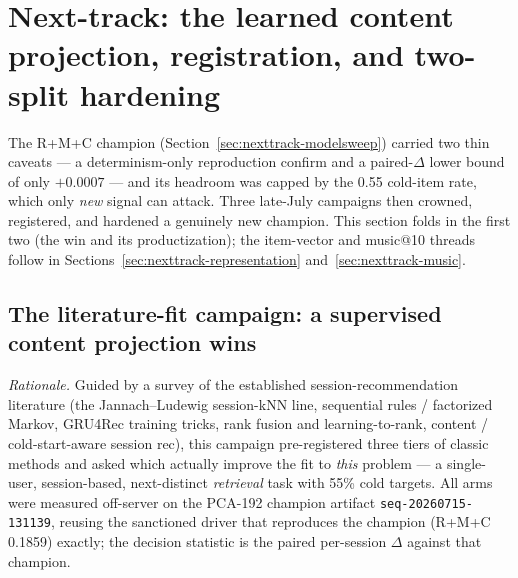 \documentclass[11pt]{article}
\newcommand{\dsid}[1]{\texttt{\small #1}}
\begin{document}
\section{Next-track: the learned content projection, registration, and two-split hardening}
\label{sec:nexttrack-projection}
The R+M+C champion (Section~\ref{sec:nexttrack-modelsweep}) carried two thin
caveats --- a determinism-only reproduction confirm and a paired-$\Delta$ lower
bound of only $+\num{0.0007}$ --- and its headroom was capped by the \num{0.55}
cold-item rate, which only \emph{new} signal can attack. Three late-July campaigns
then crowned, registered, and hardened a genuinely new champion. This section folds
in the first two (the win and its productization); the item-vector and music@10
threads follow in Sections~\ref{sec:nexttrack-representation} and~\ref{sec:nexttrack-music}.

\subsection{The literature-fit campaign: a supervised content projection wins}
\label{sec:nexttrack-projection-win}
\emph{Rationale.} Guided by a survey of the established session-recommendation
literature (the Jannach--Ludewig session-kNN line, sequential rules / factorized
Markov, GRU4Rec training tricks, rank fusion and learning-to-rank, content /
cold-start-aware session rec), this campaign pre-registered three tiers of classic
methods and asked which actually improve the fit to \emph{this} problem --- a
single-user, session-based, next-distinct \emph{retrieval} task with 55\% cold
targets. All arms were measured off-server on the PCA-192 champion artifact
\dsid{seq-20260715-131139}, reusing the sanctioned driver that reproduces the
champion (R+M+C \num{0.1859}) exactly; the decision statistic is the paired
per-session $\Delta$ against that champion.
\end{document}
